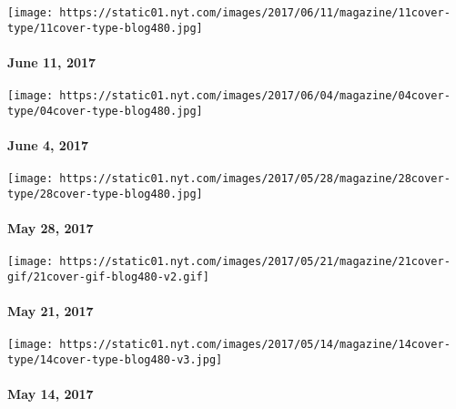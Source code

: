 \href{https://www.nytimes.com/issue/magazine/2017/06/09/the-61117-issue-20170611}{}

\texttt{[image: https://static01.nyt.com/images/2017/06/11/magazine/11cover-type/11cover-type-blog480.jpg]}

\hypertarget{june-11-2017}{%
\paragraph{June 11, 2017}\label{june-11-2017}}

\href{https://www.nytimes.com/issue/magazine/2017/06/02/magazine-index-20170604}{}

\texttt{[image: https://static01.nyt.com/images/2017/06/04/magazine/04cover-type/04cover-type-blog480.jpg]}

\hypertarget{june-4-2017}{%
\paragraph{June 4, 2017}\label{june-4-2017}}

\href{https://www.nytimes.com/issue/magazine/2017/05/26/magazine-index-20170528}{}

\texttt{[image: https://static01.nyt.com/images/2017/05/28/magazine/28cover-type/28cover-type-blog480.jpg]}

\hypertarget{may-28-2017}{%
\paragraph{May 28, 2017}\label{may-28-2017}}

\href{https://www.nytimes.com/issue/magazine/2017/05/19/magazine-index-20170521}{}

\texttt{[image: https://static01.nyt.com/images/2017/05/21/magazine/21cover-gif/21cover-gif-blog480-v2.gif]}

\hypertarget{may-21-2017}{%
\paragraph{May 21, 2017}\label{may-21-2017}}

\href{https://www.nytimes.com/issue/magazine/2017/05/12/the-51417-issue-20170514}{}

\texttt{[image: https://static01.nyt.com/images/2017/05/14/magazine/14cover-type/14cover-type-blog480-v3.jpg]}

\hypertarget{may-14-2017}{%
\paragraph{May 14, 2017}\label{may-14-2017}}

